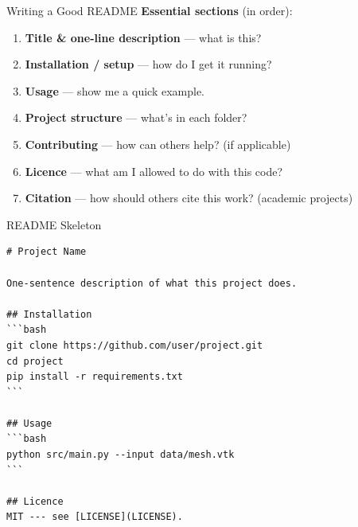 \documentclass[aspectratio=169, 11pt]{beamer}
\begin{document}
\begin{frame}[fragile]{Writing a Good README}
  \textbf{Essential sections} (in order):

  \vspace{0.3em}
  \begin{enumerate}
    \item \textbf{Title \& one-line description} --- what is this?
    \item \textbf{Installation / setup} --- how do I get it running?
    \item \textbf{Usage} --- show me a quick example.
    \item \textbf{Project structure} --- what's in each folder?
    \item \textbf{Contributing} --- how can others help? (if applicable)
    \item \textbf{Licence} --- what am I allowed to do with this code?
    \item \textbf{Citation} --- how should others cite this work? (academic projects)
  \end{enumerate}
\end{frame}

\begin{frame}[fragile]{README Skeleton}
  \vspace{0.3em}
  \begin{lstlisting}[language={}, basicstyle=\ttfamily\tiny, title={Minimal README skeleton}]
# Project Name

One-sentence description of what this project does.

## Installation
```bash
git clone https://github.com/user/project.git
cd project
pip install -r requirements.txt
```

## Usage
```bash
python src/main.py --input data/mesh.vtk
```

## Licence
MIT --- see [LICENSE](LICENSE).
  \end{lstlisting}
\end{frame}
\end{document}
